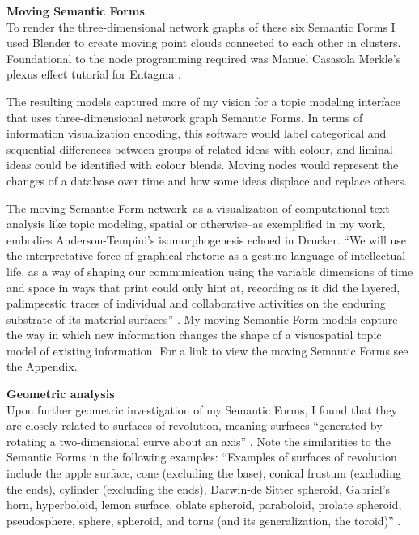 \noindent \textbf{Moving Semantic Forms} 
\\
To render the three-dimensional network graphs of these six Semantic Forms I used Blender to create moving point clouds connected to each other in clusters. Foundational to the node programming required was Manuel Casasola Merkle’s plexus effect tutorial for Entagma \citep{casasola_merkle_blender_2022}.

The resulting models captured more of my vision for a topic modeling interface that uses three-dimensional network graph Semantic Forms. In terms of information visualization encoding, this software would label categorical and sequential differences between groups of related ideas with colour, and liminal ideas could be identified with colour blends. Moving nodes would represent the changes of a database over time and how some ideas displace and replace others.
  

The moving Semantic Form network–as a visualization of computational text analysis like topic modeling, spatial or otherwise–as exemplified in my work, embodies Anderson-Tempini’s isomorphogenesis echoed in Drucker. “We will use the interpretative force of graphical rhetoric as a gesture language of intellectual life, as a way of shaping our communication using the variable dimensions of time and space in ways that print could only hint at, recording as it did the layered, palimpsestic traces of individual and collaborative activities on the enduring substrate of its material surfaces” \citep[p. 197]{drucker_graphesis_2014}. My moving Semantic Form models capture the way in which new information changes the shape of a visuospatial topic model of existing information. For a link to view the moving Semantic Forms see the Appendix.
  
  



\noindent \textbf{Geometric analysis}
\\
Upon further geometric investigation of my Semantic Forms, I found that they are closely related to surfaces of revolution, meaning surfaces “generated by rotating a two-dimensional curve about an axis” \citep{weisstein_surface_nodate}. Note the similarities to the Semantic Forms in the following examples: “Examples of surfaces of revolution include the apple surface, cone (excluding the base), conical frustum (excluding the ends), cylinder (excluding the ends), Darwin-de Sitter spheroid, Gabriel's horn, hyperboloid, lemon surface, oblate spheroid, paraboloid, prolate spheroid, pseudosphere, sphere, spheroid, and torus (and its generalization, the toroid)” \citep{weisstein_surface_nodate}.

